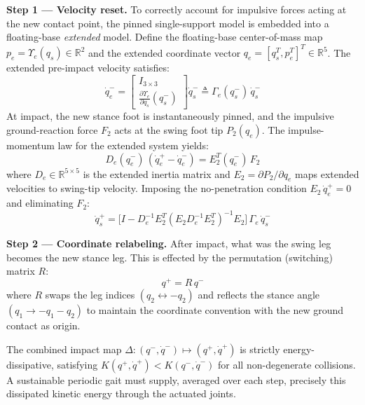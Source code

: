 \documentclass[conference]{IEEEtran}
\begin{document}
\textbf{Step 1 — Velocity reset.}
To correctly account for impulsive forces acting at the new contact point, the pinned single-support model is embedded into a floating-base \emph{extended} model. Define the floating-base center-of-mass map $p_e = \Upsilon_e(q_s) \in \mathbb{R}^2$ and the extended coordinate vector $q_e = [q_s^T, p_e^T]^T \in \mathbb{R}^5$. The extended pre-impact velocity satisfies:
\begin{equation}
    \dot{q}_e^- = \begin{bmatrix} I_{3\times3} \\ \frac{\partial \Upsilon_e}{\partial q_s}(q_s^-) \end{bmatrix}\dot{q}_s^- \triangleq \Gamma_e(q_s^-)\,\dot{q}_s^-
\end{equation}
At impact, the new stance foot is instantaneously pinned, and the impulsive ground-reaction force $F_2$ acts at the swing foot tip $P_2(q_e)$. The impulse-momentum law for the extended system yields:
\begin{equation}
    D_e(q_e^-)\,(\dot{q}_e^+ - \dot{q}_e^-) = E_2^T(q_e^-)\,F_2
\end{equation}
where $D_e \in \mathbb{R}^{5\times5}$ is the extended inertia matrix and $E_2 = \partial P_2/\partial q_e$ maps extended velocities to swing-tip velocity. Imposing the no-penetration condition $E_2\,\dot{q}_e^+ = 0$ and eliminating $F_2$:
\begin{equation}
    \dot{q}_s^+ = \bigl[I - D_e^{-1}E_2^T(E_2 D_e^{-1}E_2^T)^{-1}E_2\bigr]\,\Gamma_e\,\dot{q}_s^- \label{eq:impact_vel}
\end{equation}

\textbf{Step 2 — Coordinate relabeling.}
After impact, what was the swing leg becomes the new stance leg. This is effected by the permutation (switching) matrix $R$:
\begin{equation}
    q^+ = R\,q^-
\end{equation}
where $R$ swaps the leg indices $(q_2 \leftrightarrow -q_2)$ and reflects the stance angle $(q_1 \to -q_1 - q_2)$ to maintain the coordinate convention with the new ground contact as origin.

The combined impact map $\Delta: (q^-, \dot{q}^-) \mapsto (q^+, \dot{q}^+)$ is strictly energy-dissipative, satisfying $K(q^+, \dot{q}^+) < K(q^-, \dot{q}^-)$ for all non-degenerate collisions. A sustainable periodic gait must supply, averaged over each step, precisely this dissipated kinetic energy through the actuated joints.

\end{document}
